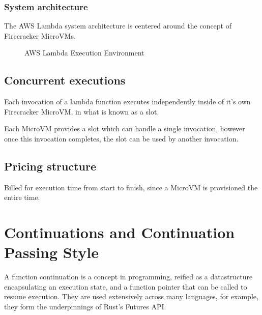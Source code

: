 \subsubsection{System architecture}

The AWS Lambda system architecture is centered around the concept of Firecracker MicroVMs\cite{agacheFirecrackerLightweightVirtualization2020}.

\begin{figure*}[t]
    \fontsize{8}{10}\selectfont
    
    \caption{AWS Lambda Execution Environment}
    \label{fig:aws-lambda-exec-env}
\end{figure*}

\subsection{Concurrent executions}

Each invocation of a lambda function executes independently inside of it's own Firecracker MicroVM, in what is known as a slot.

Each MicroVM provides a slot which can handle a single invocation, however once this invocation completes, the slot can be used by another invocation.

\subsection{Pricing structure}

Billed for execution time from start to finish, since a MicroVM is provisioned the entire time.

\section{Continuations and Continuation Passing Style}
A function continuation is a concept in programming\cite{sussmanSCHEMEInterpreterExtended1975}, reified as a datastructure encapsulating an execution state, and a function pointer that can be called to resume execution. They are used extensively across many languages, for example, they form the underpinnings of Rust's Futures API.
